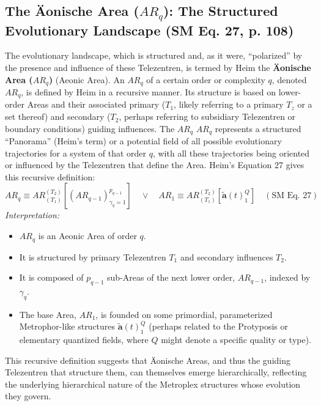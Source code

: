 \documentclass[
    12pt,              %
    a4paper,           %
    headings=normal,   %
    twoside=true,      %
    BCOR=8mm,          %
]{scrbook}
\newcommand{\q}[1]{\enquote{#1}}
\newcommand{\metrophor}{\bm{\widetilde{a}}}
\newcommand{\telezentrum}{T_z}
\newcommand{\aeonischearea}{AR_q}
\begin{document}
\subsection{The Äonische Area (\(\aeonischearea\)): The Structured Evolutionary Landscape (SM Eq. 27, p. 108)}
\label{sec:ch6_aeonische_area}
The evolutionary landscape, which is structured and, as it were, \q{polarized} by the presence and influence of these Telezentren, is termed by Heim the \textbf{Äonische Area (\(\aeonischearea\))} (Aeonic Area). An \(\aeonischearea\) of a certain order or complexity \(q\), denoted \(AR_q\), is defined by Heim in a recursive manner. Its structure is based on lower-order Areas and their associated primary (\(T_1\), likely referring to a primary \(\telezentrum\) or a set thereof) and secondary (\(T_2\), perhaps referring to subsidiary Telezentren or boundary conditions) guiding influences. The \(\aeonischearea\) \(AR_q\) represents a structured \q{Panorama} (Heim’s term) or a potential field of all possible evolutionary trajectories for a system of that order \(q\), with all these trajectories being oriented or influenced by the Telezentren that define the Area. Heim’s Equation 27 gives this recursive definition:
\begin{equation} \label{eq:original_aeonische_area} %
AR_q \equiv AR_{(T_1)}^{(T_2)} [(AR_{q-1})_{\gamma_q=1}^{p_{q-1}}] \quad \lor \quad AR_1 \equiv AR_{(T_1)}^{(T_2)} [\metrophor(t)_1^Q] \quad (\text{SM Eq. 27})
\end{equation}
\textit{Interpretation:}
\begin{itemize}
    \item   \(AR_q\) is an Aeonic Area of order \(q\).
    \item   It is structured by primary Telezentren \(T_1\) and secondary influences \(T_2\).
    \item   It is composed of \(p_{q-1}\) sub-Areas of the next lower order, \(AR_{q-1}\), indexed by \(\gamma_q\).
    \item   The base Area, \(AR_1\), is founded on some primordial, parameterized Metrophor-like structures \(\metrophor(t)_1^Q\) (perhaps related to the Protyposis or elementary quantized fields, where \(Q\) might denote a specific quality or type).
\end{itemize}
This recursive definition suggests that Äonische Areas, and thus the guiding Telezentren that structure them, can themselves emerge hierarchically, reflecting the underlying hierarchical nature of the Metroplex structures whose evolution they govern.
\end{document}
